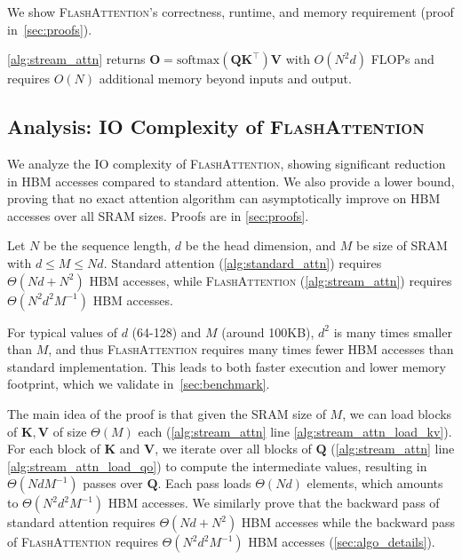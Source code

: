We show \textsc{FlashAttention}'s correctness, runtime, and memory requirement (proof in~\ref{sec:proofs}).

\begin{theorem}
  \label{thm:correctness}
  \ref{alg:stream_attn} returns $\mathbf{O} = \mathrm{softmax}(\mathbf{Q}\mathbf{K}^\top)\mathbf{V}$ with $O(N^2d)$ FLOPs and requires $O(N)$ additional memory beyond inputs and output.
\end{theorem}

\subsection{Analysis: IO Complexity of \textsc{FlashAttention}}
\label{sec:theory}

We analyze the IO complexity of \textsc{FlashAttention}, showing significant reduction in HBM accesses compared to standard attention. We also provide a lower bound, proving that no exact attention algorithm can asymptotically improve on HBM accesses over all SRAM sizes. Proofs are in \ref{sec:proofs}.

\begin{theorem}\label{thm:io_complexity}
  Let $N$ be the sequence length, $d$ be the head dimension, and $M$ be size of SRAM with $d \leq M \leq Nd$. Standard attention (\ref{alg:standard_attn}) requires $\Theta(Nd + N^2)$ HBM accesses, while \textsc{FlashAttention} (\ref{alg:stream_attn}) requires
  $\Theta ( N^2 d^2 M^{-1} )$ HBM accesses.
\end{theorem}

For typical values of $d$ (64-128) and $M$ (around 100KB), $d^2$ is many times smaller than $M$, and thus \textsc{FlashAttention} requires many times fewer HBM accesses than standard implementation. This leads to both faster execution and lower memory footprint, which we validate in~\ref{sec:benchmark}.

The main idea of the proof is that given the SRAM size of $M$, we can load blocks of $\mathbf{K}, \mathbf{V}$ of size $\Theta(M)$ each (\ref{alg:stream_attn} line \ref{alg:stream_attn_load_kv}).
For each block of $\mathbf{K}$ and $\mathbf{V}$, we iterate over all blocks of $\mathbf{Q}$
(\ref{alg:stream_attn} line \ref{alg:stream_attn_load_qo}) to compute the intermediate values, resulting in $\Theta(NdM^{-1})$ passes over $\mathbf{Q}$.
Each pass loads $\Theta(Nd)$ elements, which amounts to $\Theta(N^2 d^2 M^{-1})$ HBM accesses. We similarly prove that the backward pass of standard attention requires
$\Theta(Nd + N^2)$ HBM accesses while the backward pass of \textsc{FlashAttention} requires
$\Theta(N^2 d^2 M^{-1})$ HBM accesses (\ref{sec:algo_details}).

